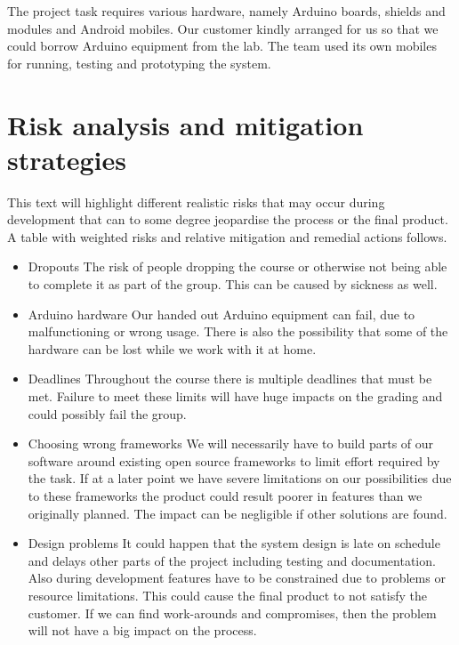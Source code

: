 The project task requires various hardware, namely Arduino boards, shields and modules and Android mobiles.
Our customer kindly arranged for us so that we could borrow Arduino equipment from the lab. The team used its own
mobiles for running, testing and prototyping the system.

\newpage
\section{Risk analysis and mitigation strategies}

This text will highlight different realistic risks that may occur during development
that can to some degree jeopardise the process or the final product.
A table with weighted risks and relative mitigation and remedial actions follows.

\begin{itemize}

\item{Dropouts}\newline
The risk of people dropping the course or otherwise not being able to complete it as part
of the group. This can be caused by sickness as well.

\item{Arduino hardware}\newline
Our handed out Arduino equipment can fail, due to malfunctioning or wrong usage.
There is also the possibility that some of the hardware can be lost while we work with it at home.

\item{Deadlines}\newline
Throughout the course there is multiple deadlines that must be met. Failure to meet
these limits will have huge impacts on the grading and could possibly fail the group.

\item{Choosing wrong frameworks}\newline
We will necessarily have to build parts of our software around existing open source
frameworks to limit effort required by the task. If at a later point we have severe limitations
on our possibilities due to these frameworks the product could result poorer in features than
we originally planned. The impact can be negligible if other solutions are found.

\item{Design problems}\newline
It could happen that the system design is late on schedule and delays other parts of the project
including testing and documentation. Also during development features have to be constrained due to problems
or resource limitations. This could cause the final product to not satisfy the customer.
If we can find work-arounds and compromises, then the problem will not have a big impact on the process.


\end{itemize}
